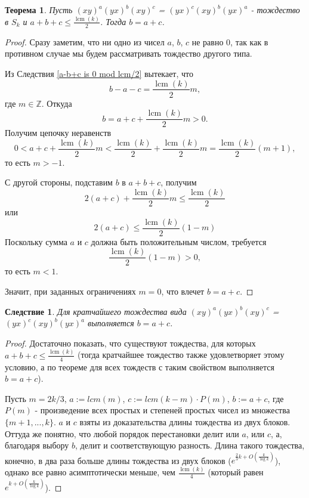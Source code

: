 \documentclass[12pt]{article}
\newtheorem{theorem}{Теорема}
\newtheorem{corollary}{Следствие}
\DeclareMathOperator{\lcm}{lcm}
\begin{document}
	\begin{theorem}\label{b is a plus c}
		Пусть $(xy)^a(yx)^b(xy)^c$ = $(yx)^c(xy)^b(yx)^a$ - тождество в $S_k$ и $a + b + c \le \frac{\lcm(k)}{2}$. Тогда $b = a+c$.
	\end{theorem}
	\begin{proof}
		Сразу заметим, что ни одно из чисел $a$, $b$, $c$ не равно 0, так как в противном случае мы будем рассматривать тождество другого типа.
		
		Из Следствия \ref{a-b+c is 0 mod lcm/2} вытекает, что \hspace{5pt} 
		$$
			b - a - c = \frac{\lcm(k)}{2}m,
		$$ где $m \in \mathbb{Z}$. 
		Откуда
		$$
			b = a + c + \frac{\lcm(k)}{2}m > 0.
		$$
		Получим цепочку неравенств 
		$$
			0 < a + c + \frac{\lcm(k)}{2}m < \frac{\lcm(k)}{2} + \frac{\lcm(k)}{2}m = \frac{\lcm(k)}{2}(m + 1),
		$$то есть $m > -1$.
		
		С другой стороны, подставим $b$ в $a+b+c$, получим
		$$
			2(a + c) + \frac{\lcm(k)}{2}m \le \frac{\lcm(k)}{2}
		$$ или 
		$$
			2(a + c) \le \frac{\lcm(k)}{2}(1-m)
		$$
		Поскольку сумма $a$ и $c$ должна быть положительным числом, требуется
		$$
			\frac{\lcm(k)}{2}(1-m) > 0,
		$$ то есть $m < 1$.
		
		Значит, при заданных ограничениях $m = 0$, что влечет $b = a + c$.
	\end{proof}

	\begin{corollary}
		Для кратчайшего тождества вида $(xy)^a(yx)^b(xy)^c$ = $(yx)^c(xy)^b(yx)^a$ выполняется $b = a + c$.
	\end{corollary}
	\begin{proof}
		Достаточно показать, что существуют тождества, для которых $a + b + c \le \frac{\lcm(k)}{4}$ (тогда кратчайшее тождество также удовлетворяет этому условию, а по теореме для всех тождеств с таким свойством выполняется $b = a + c$).
		
		Пусть $m = 2k/3$, $a := lcm(m)$, $c := lcm(k - m) \cdot P(m)$, $b := a+c$, где $P(m)$ - произведение всех простых и степеней простых чисел из множества $\{m+1, ..., k\}$. $a$ и $c$ взяты из доказательства длины тождества из двух блоков. Оттуда же понятно, что любой порядок перестановки делит или $a$, или $c$, а, благодаря выбору $b$, делит и соответствующую разность. Длина такого тождества, конечно, в два раза больше длины тождества из двух блоков ($e^{\frac{2}{3}k + O(\frac{k}{\log k})}$), однако все равно асимптотически меньше, чем $\frac{\lcm(k)}{4}$ (который  равен $e^{k + O(\frac{k}{\log k})}$).
	\end{proof}
\end{document}
